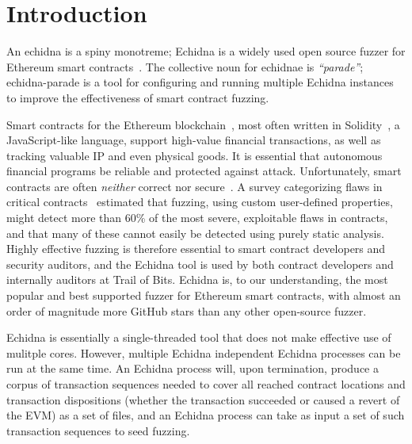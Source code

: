 \documentclass[sigconf]{acmart}
\begin{document}



\maketitle

\section{Introduction}

An echidna is a spiny monotreme; Echidna is a widely used open source fuzzer for
Ethereum smart contracts~\cite{echidnaissta}.  The collective noun for
echidnae is \emph{``parade''}; echidna-parade is a tool for configuring and
running multiple Echidna instances to improve the
effectiveness of smart contract fuzzing.

Smart contracts for the Ethereum blockchain~\cite{buterin2013whitepaper}, most often written in Solidity~\cite{wood2014yellow}, a
JavaScript-like language, support high-value financial transactions,
as well as tracking valuable IP and even physical goods.  It is essential that
autonomous financial programs be reliable and protected against
attack.  Unfortunately, smart contracts are often \emph{neither}
correct nor secure~\cite{SurveyAttacks}.  A survey categorizing flaws
in critical contracts~\cite{FC20} estimated that fuzzing, using custom
user-defined properties, might detect more than 60\% of the most
severe, exploitable flaws in contracts, and that many of these cannot easily
be detected using purely static analysis.  Highly effective fuzzing is
therefore essential to smart contract developers and security
auditors, and the Echidna tool is used by both contract developers
and internally auditors at Trail of Bits.  Echidna is, to our understanding, the most popular and best supported fuzzer for Ethereum smart contracts, with almost an order of magnitude more GitHub stars than any other open-source fuzzer.

Echidna is essentially a single-threaded tool that does not make
effective use of mulitple cores.  However, multiple Echidna
independent Echidna processes can be run at the same time.  An Echidna
process will, upon termination, produce a corpus of transaction
sequences needed to cover all reached contract locations and
transaction dispositions (whether the transaction succeeded or caused
a revert of the EVM) as a set of files, and an Echidna process can
take as input a set of such transaction sequences to seed fuzzing.
\end{document}
